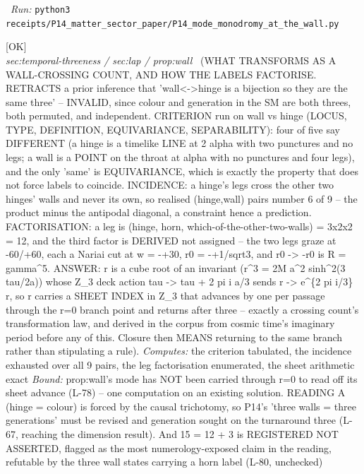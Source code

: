 \begin{description}
\ \emph{Run:} \texttt{python3 receipts/P14\_matter\_sector\_paper/P14\_mode\_monodromy\_at\_the\_wall.py}
\item[\label{rcpt:P03_sheet_index_and_factors}\texttt{P03\_sheet\_index\_and\_factors}]\hfill\textsf{[OK]}\\
\textit{sec:temporal-threeness / sec:lap / prop:wall} \ (WHAT TRANSFORMS AS A WALL-CROSSING COUNT, AND HOW THE LABELS FACTORISE. RETRACTS a prior inference that 'wall<->hinge is a bijection so they are the same three' -- INVALID, since colour and generation in the SM are both threes, both permuted, and independent. CRITERION run on wall vs hinge (LOCUS, TYPE, DEFINITION, EQUIVARIANCE, SEPARABILITY): four of five say DIFFERENT (a hinge is a timelike LINE at 2 alpha with two punctures and no legs; a wall is a POINT on the throat at alpha with no punctures and four legs), and the only 'same' is EQUIVARIANCE, which is exactly the property that does not force labels to coincide. INCIDENCE: a hinge's legs cross the other two hinges' walls and never its own, so realised (hinge,wall) pairs number 6 of 9 -- the product minus the antipodal diagonal, a constraint hence a prediction. FACTORISATION: a leg is (hinge, horn, which-of-the-other-two-walls) = 3x2x2 = 12, and the third factor is DERIVED not assigned -- the two legs graze at -60/+60, each a Nariai cut at w = -+30, r0 = -+1/sqrt3, and r0 -> -r0 is R = gamma\textasciicircum{}5. ANSWER: r is a cube root of an invariant (r\textasciicircum{}3 = 2M a\textasciicircum{}2 sinh\textasciicircum{}2(3 tau/2a)) whose Z\_3 deck action tau -> tau + 2 pi i a/3 sends r -> e\textasciicircum{}\{2 pi i/3\} r, so r carries a SHEET INDEX in Z\_3 that advances by one per passage through the r=0 branch point and returns after three -- exactly a crossing count's transformation law, and derived in the corpus from cosmic time's imaginary period before any of this. Closure then MEANS returning to the same branch rather than stipulating a rule). 
\emph{Computes:} the criterion tabulated, the incidence exhausted over all 9 pairs, the leg factorisation enumerated, the sheet arithmetic exact
 \emph{Bound:} prop:wall's mode has NOT been carried through r=0 to read off its sheet advance (L-78) -- one computation on an existing solution. READING A (hinge = colour) is forced by the causal trichotomy, so P14's 'three walls = three generations' must be revised and generation sought on the turnaround three (L-67, reaching the dimension result). And 15 = 12 + 3 is REGISTERED NOT ASSERTED, flagged as the most numerology-exposed claim in the reading, refutable by the three wall states carrying a horn label (L-80, unchecked)

\end{description}
